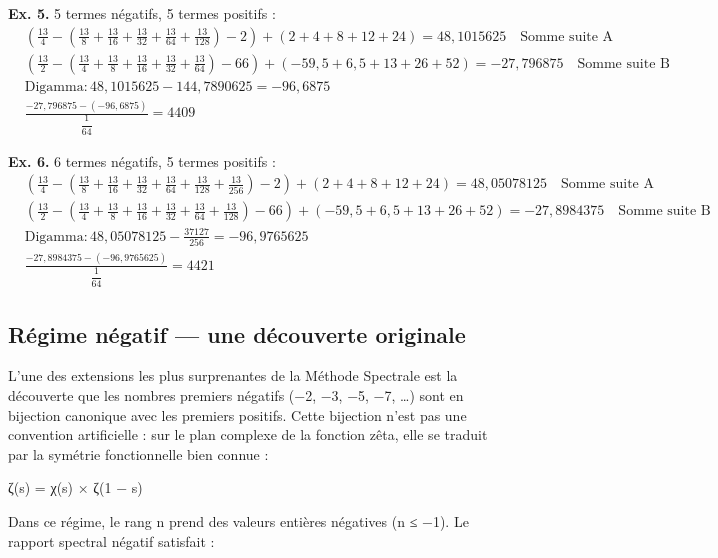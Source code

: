\documentclass[11pt,a4paper]{article}
\begin{document}
\textbf{Ex. 5.} 5 termes négatifs, 5 termes positifs :
\begin{align*}
&\left(\frac{13}{4} - \left(\frac{13}{8} + \frac{13}{16} + \frac{13}{32} + \frac{13}{64} + \frac{13}{128}\right) - 2\right) + \left(2 + 4 + 8 + 12 + 24\right) = 48{,}1015625 \quad \text{Somme suite A} \\
&\left(\frac{13}{2} - \left(\frac{13}{4} + \frac{13}{8} + \frac{13}{16} + \frac{13}{32} + \frac{13}{64}\right) - 66\right) + \left(-59{,}5 + 6{,}5 + 13 + 26 + 52\right) = -27{,}796875 \quad \text{Somme suite B} \\
&\text{Digamma}: 48{,}1015625 - 144{,}7890625 = -96{,}6875 \\
&\frac{-27{,}796875 - (-96{,}6875)}{\dfrac{1}{64}} = 4409
\end{align*}

\bigskip

\textbf{Ex. 6.} 6 termes négatifs, 5 termes positifs :
\begin{align*}
&\left(\frac{13}{4} - \left(\frac{13}{8} + \frac{13}{16} + \frac{13}{32} + \frac{13}{64} + \frac{13}{128} + \frac{13}{256}\right) - 2\right) + \left(2 + 4 + 8 + 12 + 24\right) = 48{,}05078125 \quad \text{Somme suite A} \\
&\left(\frac{13}{2} - \left(\frac{13}{4} + \frac{13}{8} + \frac{13}{16} + \frac{13}{32} + \frac{13}{64} + \frac{13}{128}\right) - 66\right) + \left(-59{,}5 + 6{,}5 + 13 + 26 + 52\right) = -27{,}8984375 \quad \text{Somme suite B} \\
&\text{Digamma}: 48{,}05078125 - \frac{37127}{256} = -96{,}9765625 \\
&\frac{-27{,}8984375 - (-96{,}9765625)}{\dfrac{1}{64}} = 4421
\end{align*}


\subsection{Régime négatif — une découverte originale}

L'une des extensions les plus surprenantes de la Méthode Spectrale est la découverte que les nombres premiers négatifs (−2, −3, −5, −7, …) sont en bijection canonique avec les premiers positifs. Cette bijection n'est pas une convention artificielle : sur le plan complexe de la fonction zêta, elle se traduit par la symétrie fonctionnelle bien connue :

ζ(s) = χ(s) × ζ(1 − s)

Dans ce régime, le rang n prend des valeurs entières négatives (n ≤ −1). Le rapport spectral négatif satisfait :
\end{document}
